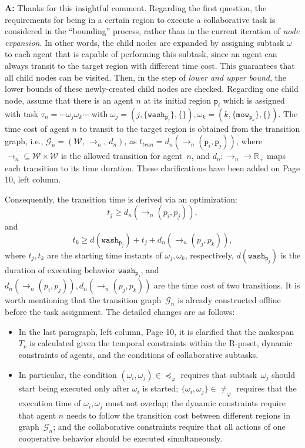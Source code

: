 \documentclass[10pt]{article}
\begin{document}
\textbf{A:} Thanks for this insightful comment.
Regarding the first question,
the requirements for being in a certain region to execute a
collaborative task is considered in the ``bounding'' process,
rather than in the current iteration
of \emph{node expansion}.
In other words, the child nodes are expanded by assigning subtask $\omega$ to
each agent that is capable of performing this subtask,
since an agent can always transit to the target region with different time cost.
This guarantees that all child nodes can be visited.
Then, in the step of \emph{lower and upper bound},
the lower bounds of these newly-created child nodes are checked.
Regarding one child node, assume that there is an agent $n$ at its initial region $\texttt{p}_{i}$
which is assigned with task $\tau_n=\cdots\omega_j\omega_k\cdots$ with
$\omega_j=(j, \{\texttt{wash}_{\texttt{p}_{j}}\}, \{\}), \omega_k=(k, \{\texttt{mow}_{\texttt{p}_k}\},\{\})$.
The time cost of agent $n$ to transit to the target region is obtained from the transition graph, i.e., $\mathcal{G}_n=({\mathcal{W}},\,\rightarrow_n,\,d_n)$, as $t_{tran}=d_n(\rightarrow_n(\texttt{p}_{i},\texttt{p}_{j}))$, where $\rightarrow_n\subseteq {\mathcal{W}}\times {\mathcal{W}}$
is the allowed transition for agent~$n$,
and $d_n:\rightarrow_n \rightarrow \mathbb{R}_{+}$ maps each transition to its time duration.
These clarifications have been added on Page 10, left column.

Consequently, the transition time is derived via an optimization:
$$t_j\geq d_n(\rightarrow_n(p_i,p_j)),$$
and $$t_k\geq d(\texttt{wash}_{\texttt{p}_{j}})+t_j+d_n(\rightarrow_n(p_j,p_k)) ,$$
where $t_j,t_k$ are the starting time instants of $\omega_j,\omega_k$, respectively,
$d(\texttt{wash}_{\texttt{p}_{j}})$ is the duration of executing behavior $\texttt{wash}_{\texttt{p}_{j}}$,
and $d_n(\rightarrow_n(p_i,p_j)), d_n(\rightarrow_n(p_j,p_k))$ are the time cost of two transitions.
It is worth mentioning that the transition graph~$\mathcal{G}_n$ is already
constructed offline before the task assignment.
The detailed changes are as follows:
\begin{itemize}
\item In the last paragraph, left column, Page 10, it is clarified that
  the makespan $T_\nu$ is calculated given
  the temporal constraints within the R-poset, dynamic constraints of agents, and the conditions of collaborative subtasks.

\item In particular, the condition $(\omega_i,\omega_j)\in\preceq_\varphi$ requires that subtask~$\omega_j$
  should start being executed only after $\omega_i$ is started;
  $\{\omega_i,\omega_j\}\in\neq_\varphi$ requires that the execution time of $\omega_i, \omega_j$ must not overlap;
  the dynamic constraints require that agent $n$ needs to follow the transition
  cost between different regions in graph~$\mathcal{G}_n$;
  and the collaborative constraints require that all actions of
  one cooperative behavior should be executed simultaneously.
\end{itemize}
\end{document}
